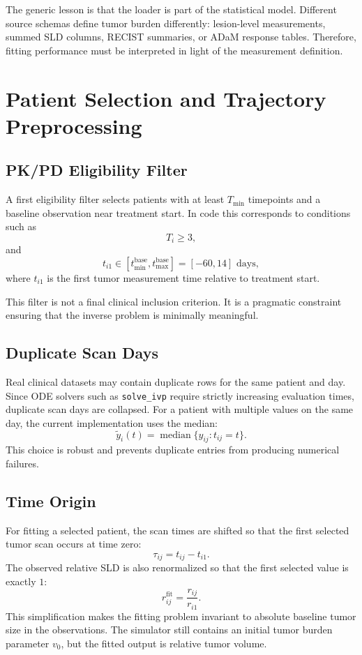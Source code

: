 \documentclass[11pt,a4paper]{article}
\begin{document}
The generic lesson is that the loader is part of the statistical model. Different source schemas define tumor burden differently: lesion-level measurements, summed SLD columns, RECIST summaries, or ADaM response tables. Therefore, fitting performance must be interpreted in light of the measurement definition.

\section{Patient Selection and Trajectory Preprocessing}

\subsection{PK/PD Eligibility Filter}

A first eligibility filter selects patients with at least $T_{\min}$ timepoints and a baseline observation near treatment start. In code this corresponds to conditions such as
\[
    T_i \geq 3,
\]
and
\[
    t_{i1} \in [t_{\min}^{\mathrm{base}}, t_{\max}^{\mathrm{base}}]
    = [-60,14] \text{ days},
\]
where $t_{i1}$ is the first tumor measurement time relative to treatment start.

This filter is not a final clinical inclusion criterion. It is a pragmatic constraint ensuring that the inverse problem is minimally meaningful.

\subsection{Duplicate Scan Days}

Real clinical datasets may contain duplicate rows for the same patient and day. Since ODE solvers such as \texttt{solve\_ivp} require strictly increasing evaluation times, duplicate scan days are collapsed. For a patient with multiple values on the same day, the current implementation uses the median:
\[
    \tilde{y}_{i}(t)
    = \operatorname{median}\{y_{ij}: t_{ij}=t\}.
\]
This choice is robust and prevents duplicate entries from producing numerical failures.

\subsection{Time Origin}

For fitting a selected patient, the scan times are shifted so that the first selected tumor scan occurs at time zero:
\[
    \tau_{ij} = t_{ij} - t_{i1}.
\]
The observed relative SLD is also renormalized so that the first selected value is exactly $1$:
\[
    r_{ij}^{\mathrm{fit}} = \frac{r_{ij}}{r_{i1}}.
\]
This simplification makes the fitting problem invariant to absolute baseline tumor size in the observations. The simulator still contains an initial tumor burden parameter $v_0$, but the fitted output is relative tumor volume.
\end{document}
